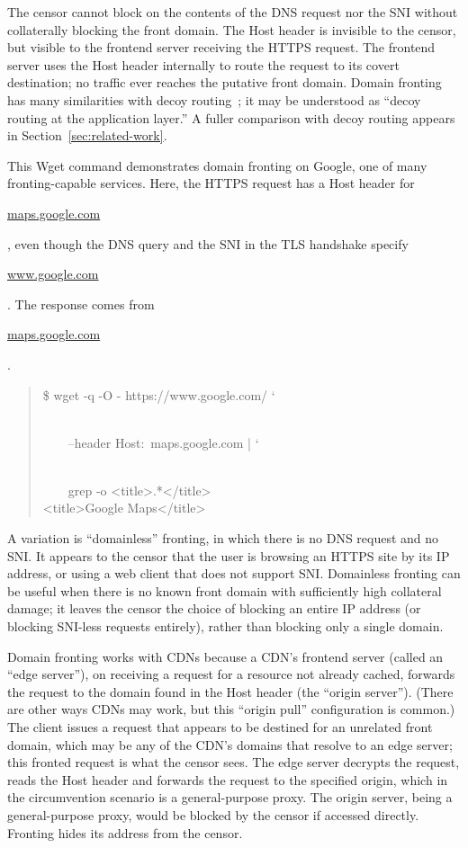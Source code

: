 \documentclass{sig-alternate}
\def\urll#1{\begin{NoHyper}\url{#1}\end{NoHyper}}
\begin{document}
The censor cannot block on the contents of the DNS request nor the SNI without
collaterally blocking the front domain.
The Host header is invisible to the censor,
but visible to the frontend server receiving the HTTPS request.
The frontend server uses the Host header internally to route the request
to its covert destination; no traffic ever reaches the putative front domain.
Domain fronting has many similarities with decoy routing~\cite{decoyrouting,telex,cirripede,tapdance};
it may be understood as
``decoy routing at the application layer.''
A fuller comparison with decoy routing appears in Section~\ref{sec:related-work}.

This Wget command demonstrates domain fronting
on Google, one of many fronting-capable services.
Here, the HTTPS request has a Host header for \urll{maps.google.com},
even though the DNS query and the SNI in the TLS handshake specify \urll{www.google.com}.
The response comes from \urll{maps.google.com}.

\noindent
\begin{quote}
%
\$ wget -q -O - https://www.google.com/ \char`\\\\
\strut~~~~--header \textquotesingle{}Host:~maps.google.com\textquotesingle{} | \char`\\\\
\strut~~~~grep -o \textquotesingle{}<title>.*</title>\textquotesingle{}\\
<title>Google Maps</title>
\end{quote}

A variation is ``domainless'' fronting,
in which there is no DNS request and no SNI.
It appears to the censor
that the user is browsing an HTTPS site by its IP address,
or using a web client that does not support SNI.
Domainless fronting can be useful when there is no known front domain
with sufficiently high collateral damage;
it leaves the censor the choice of blocking an entire IP address
(or blocking SNI-less requests entirely),
rather than blocking only a single domain.

Domain fronting works with CDNs because a CDN's frontend server
(called an ``edge server''),
on receiving a request for a resource not already cached,
forwards the request to the domain found in the Host header
(the ``origin server'').
(There are other ways CDNs may work, but this ``origin pull''
configuration is common.)
The client issues a request that appears to be destined for
an unrelated front domain, which may be any of the CDN's domains
that resolve to an edge server; this fronted request is what the censor sees.
The edge server decrypts the request,
reads the Host header and
forwards the request to the specified origin,
which in the circumvention scenario is a general-purpose proxy.
The origin server, being a general-purpose proxy, would be blocked by the censor if accessed directly.
Fronting hides its address from the censor.
\end{document}
